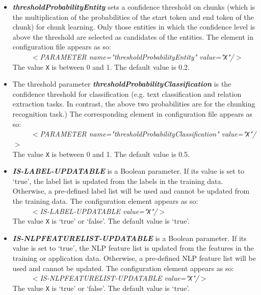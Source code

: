 \begin{itemize}
\item {\em {\bf thresholdProbabilityEntity}} sets a confidence 
threshold on chunks (which is the multiplication of the probabilities
of the start token and end token of the chunk) for chunk learning.
Only those entities in which the confidence level is above the
threshold are selected as candidates of the entities. The element in
configuration file appears as so:\\
\ \ \ \ \ {\em $<$PARAMETER name="thresholdProbabilityEntity" value="\texttt{X}"/$>$}\\
The value \texttt{X} is between 0 and 1. The default value is  0.2.

\item The threshold parameter {\em {\bf thresholdProbabilityClassification}} 
is the confidence threshold for classification (e.g. text
classification and relation extraction tasks. In contrast, the above
two probabilities are for the chunking recognition task.)  The
corresponding element in configuration file appears as so:\\
\ \ \ \ \ {\em $<$PARAMETER name="thresholdProbabilityClassification"
value="\texttt{X}"/$>$}\\ The value \texttt{X} is between 0 and 1. The default value is 0.5.

\item {\em {\bf IS-LABEL-UPDATABLE}} is a Boolean parameter. If its value is set
to `true', the label list is updated from the labels in the training
data. Otherwise, a pre-defined label list will be used and cannot be
updated from the training data. The configuration element appears as so:\\
\ \ \ \ \ {\em $<$IS-LABEL-UPDATABLE value="\texttt{X}"/$>$}\\ The
value \texttt{X} is `true' or `false'. The default value is
`true'.

\item {\em {\bf IS-NLPFEATURELIST-UPDATABLE}} is a Boolean parameter. If its
value is set to `true', the NLP feature list is updated from the features in the
training or application data. Otherwise, a pre-defined NLP feature
list will be used and cannot be updated. The configuration element
appears as so:\\ 
\ \ \ \ \ {\em $<$IS-NLPFEATURELIST-UPDATABLE value="\texttt{X}"/$>$}\\ The
value \texttt{X} is `true' or `false'. The default value is `true'.


\end{itemize}
